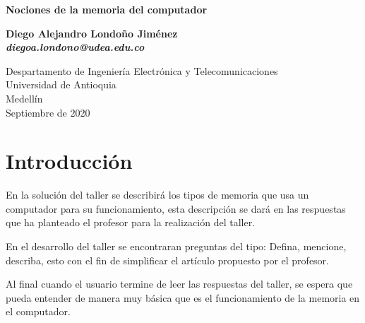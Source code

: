 \documentclass[12pt,letterpaper]{article}
\begin{document}

\begin{titlepage}
    \begin{center}
        \vspace*{1cm}
            
        \Huge
        \textbf{Nociones de la memoria del computador \textcolor{red}{\Biohazard}}
            
        \vspace{0.5cm}
        \LARGE
            
        \vspace{1.5cm}
            
        \textbf{Diego Alejandro Londoño Jiménez\\ \emph{diegoa.londono@udea.edu.co} }
            
        \vfill
            
        \vspace{0.8cm}
            
        \Large
        Despartamento de Ingeniería Electrónica y Telecomunicaciones\\
        Universidad de Antioquia\\
        Medellín\\
        Septiembre de 2020\\
        
            
    \end{center}
\end{titlepage}



\tableofcontents


\newpage

\section{Introducción}

En la solución del taller se describirá los tipos de memoria que usa un computador para su funcionamiento, esta descripción se dará en las respuestas que ha planteado el profesor para la realización del taller.

En el desarrollo del taller se encontraran preguntas del tipo: Defina, mencione, describa, esto con el fin de simplificar el artículo propuesto por el profesor.

Al final cuando el usuario termine de leer las respuestas del taller, se espera que pueda entender de manera muy básica que es el funcionamiento de la memoria en el computador.
\end{document}

